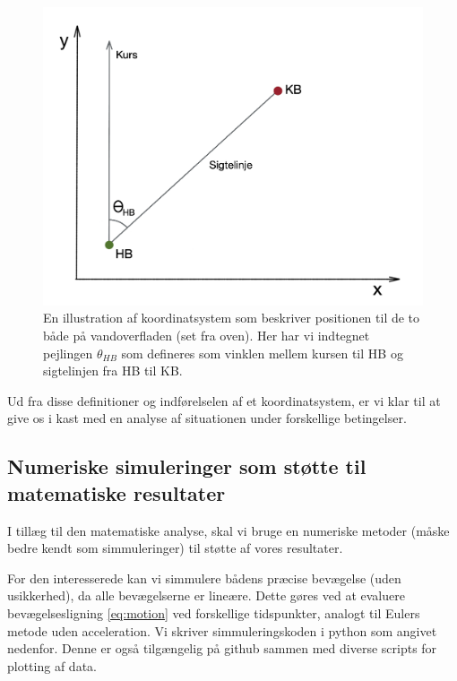 \documentclass[%
 reprint,
nofootinbib,
aps,
]{revtex4-1}
\begin{document}
\begin{figure}[H]
  \includegraphics[width=\linewidth]{figures/metode_tegning.png}
  \caption{En illustration af koordinatsystem som beskriver positionen til de to både på vandoverfladen (set fra oven). Her har vi indtegnet pejlingen $\theta_{HB}$ som defineres som vinklen mellem kursen til HB og sigtelinjen fra HB til KB.}
  \label{fig:metode_tegning}
\end{figure}
Ud fra disse definitioner og indførelselen af et koordinatsystem, er vi klar til at give os i kast med en analyse af situationen under forskellige betingelser.

\subsection{Numeriske simuleringer som støtte til matematiske resultater}\label{sec:numerical_method}
I tillæg til den matematiske analyse, skal vi bruge en numeriske metoder (måske bedre kendt som simmuleringer) til støtte af vores resultater. \par
For den interesserede kan vi simmulere bådens præcise bevægelse (uden usikkerhed), da alle bevægelserne er lineære. Dette gøres ved at evaluere bevægelsesligning \ref{eq:motion} ved forskellige tidspunkter, analogt til Eulers metode uden acceleration. Vi skriver simmuleringskoden i python som angivet nedenfor. Denne er også tilgængelig på github \cite{github} sammen med diverse scripts for plotting af data.
\end{document}
